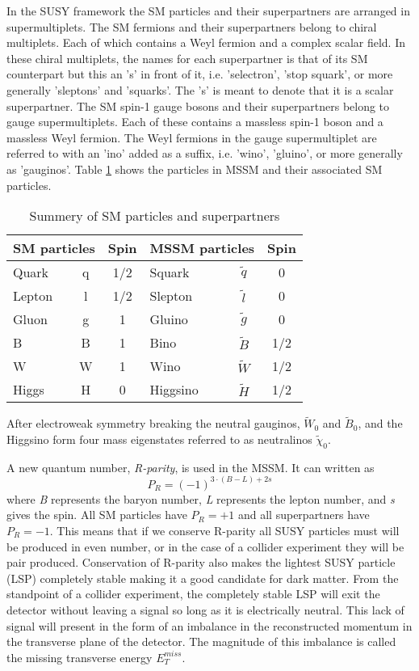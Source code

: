In the SUSY framework the SM particles and their superpartners are arranged in supermultiplets\cite{Martin:1997ns}.  The SM fermions and their superpartners belong to chiral multiplets.  Each of which contains a Weyl fermion and a complex scalar field.  In these chiral multiplets, the names for each superpartner is that of its SM counterpart but this an 's' in front of it, i.e. 'selectron', 'stop squark', or more generally 'sleptons' and 'squarks'.  The 's' is meant to denote that it is a scalar superpartner.  The SM spin-1 gauge bosons and their superpartners belong to gauge supermultiplets.  Each of these contains a massless spin-1 boson and a massless Weyl fermion.  The Weyl fermions in the gauge supermultiplet are referred to with an 'ino' added as a suffix, i.e. 'wino', 'gluino', or more generally as 'gauginos'.  Table \ref{table:susyparticles} shows the particles in MSSM and their associated SM particles.
\begin{table}[h]
	\centering
	\caption{Summery of SM particles and superpartners}
	\begin{tabular}{|l|c|c|l|c|c|}
		\hline
		\hline
		\multicolumn{2}{|c|}{SM particles} & Spin & \multicolumn{2}{|c|}{MSSM particles} & Spin \\
		\hline
		Quark & q & 1/2 & Squark & $\tilde{q}$ & 0 \\
		Lepton & l & 1/2 & Slepton & $\tilde{l}$ & 0 \\
		\hline
		Gluon & g & 1 & Gluino & $\tilde{g}$ & 0 \\
		B & B & 1 & Bino &$\tilde{B}$ & 1/2 \\
		W & W & 1 & Wino & $\tilde{W}$ & 1/2 \\
		Higgs & H & 0 & Higgsino & $\tilde{H}$ & 1/2 \\
		\hline	
	\end{tabular}
	\label{table:susyparticles}  
\end{table}
After electroweak symmetry breaking the neutral gauginos, $\tilde{W}_0$ and $\tilde{B}_0$, and the Higgsino form four mass eigenstates referred to as neutralinos $\tilde{\chi}_0$.

A new quantum number, \textit{R-parity}, is used in the MSSM.  It can written as
\begin{equation}
	P_R = (-1)^{3\cdot(B-L)+2s}
\end{equation}
where \textit{B} represents the baryon number, \textit{L} represents the lepton number, and \textit{s} gives the spin.  All SM particles have $P_R = +1$ and all superpartners have $P_R = -1$.  This means that if we conserve R-parity all SUSY particles must will be produced in even number, or in the case of a collider experiment they will be pair produced.  Conservation of R-parity also makes the lightest SUSY particle (LSP) completely stable making it a good candidate for dark matter.  From the standpoint of a collider experiment, the completely stable LSP will exit the detector without leaving a signal so long as it is electrically neutral.  This lack of signal will present in the form of an imbalance in the reconstructed momentum in the transverse plane of the detector.  The magnitude of this imbalance is called the missing transverse energy $E_T^{miss}$.

